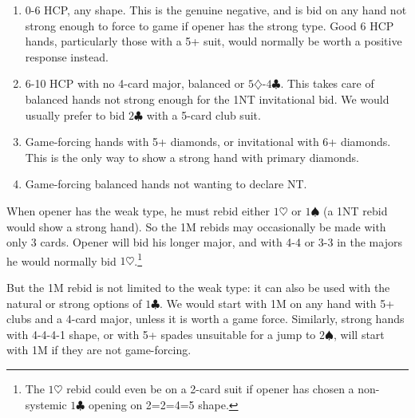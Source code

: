 \documentclass{article}
\newcommand{\sz}{\spadesuit}
\newcommand{\hz}{\heartsuit}
\newcommand{\dz}{\diamondsuit}
\newcommand{\cz}{\clubsuit}
\begin{document}
\begin{enumerate}
\item[(i)] 0-6 HCP, any shape. This is the genuine negative, and is bid on any hand not strong enough to force to game if opener has the strong type. Good 6 HCP hands, particularly those with a 5+ suit, would normally be worth a positive response instead.
\item[(ii)] 6-10 HCP with no 4-card major, balanced or $5\dz$-$4\cz$. This takes care of balanced hands not strong enough for the 1NT invitational bid. We would usually prefer to bid $2\cz$ with a 5-card club suit.
\item[(iii)] Game-forcing hands with 5+ diamonds, or invitational with 6+ diamonds. This is the only way to show a strong hand with primary diamonds.
\item[(iv)] Game-forcing balanced hands not wanting to declare NT.
\end{enumerate}

When opener has the weak type, he must rebid either $1\hz$ or $1\sz$ (a 1NT rebid would show a strong hand). So the 1M rebids may occasionally be made with only 3 cards. Opener will bid his longer major, and with 4-4 or 3-3 in the majors he would normally bid $1\hz$.\footnote{The $1\hz$ rebid could even be on a 2-card suit if opener has chosen a non-systemic $1\cz$ opening on 2=2=4=5 shape.}

But the 1M rebid is not limited to the weak type: it can also be used with the natural or strong options of $1\cz$. We would start with 1M on any hand with 5+ clubs and a 4-card major, unless it is worth a game force. Similarly, strong hands with 4-4-4-1 shape, or with 5+ spades unsuitable for a jump to $2\sz$, will start with 1M if they are not game-forcing.
\end{document}
